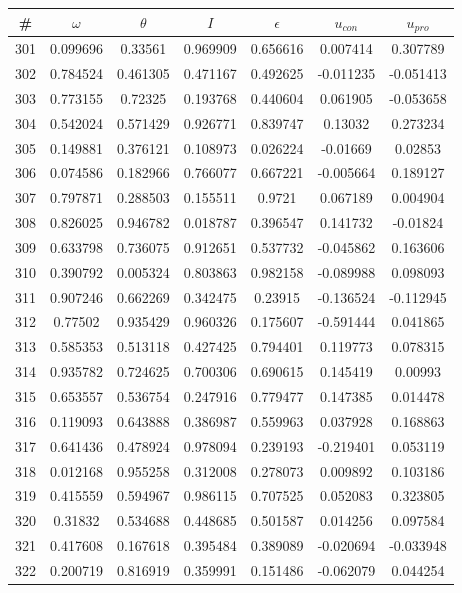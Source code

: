 \begin{table}
\begin{tabular}{c|c|c|c|c|c|c}
\# & $\omega$ & $\theta$ & $I$ & $\epsilon$ & $u_{con}$ & $u_{pro}$\\
\hline
301 & 0.099696 & 0.33561 & 0.969909 & 0.656616 & 0.007414 & 0.307789\\
302 & 0.784524 & 0.461305 & 0.471167 & 0.492625 & -0.011235 & -0.051413\\
303 & 0.773155 & 0.72325 & 0.193768 & 0.440604 & 0.061905 & -0.053658\\
304 & 0.542024 & 0.571429 & 0.926771 & 0.839747 & 0.13032 & 0.273234\\
305 & 0.149881 & 0.376121 & 0.108973 & 0.026224 & -0.01669 & 0.02853\\
306 & 0.074586 & 0.182966 & 0.766077 & 0.667221 & -0.005664 & 0.189127\\
307 & 0.797871 & 0.288503 & 0.155511 & 0.9721 & 0.067189 & 0.004904\\
308 & 0.826025 & 0.946782 & 0.018787 & 0.396547 & 0.141732 & -0.01824\\
309 & 0.633798 & 0.736075 & 0.912651 & 0.537732 & -0.045862 & 0.163606\\
310 & 0.390792 & 0.005324 & 0.803863 & 0.982158 & -0.089988 & 0.098093\\
311 & 0.907246 & 0.662269 & 0.342475 & 0.23915 & -0.136524 & -0.112945\\
312 & 0.77502 & 0.935429 & 0.960326 & 0.175607 & -0.591444 & 0.041865\\
313 & 0.585353 & 0.513118 & 0.427425 & 0.794401 & 0.119773 & 0.078315\\
314 & 0.935782 & 0.724625 & 0.700306 & 0.690615 & 0.145419 & 0.00993\\
315 & 0.653557 & 0.536754 & 0.247916 & 0.779477 & 0.147385 & 0.014478\\
316 & 0.119093 & 0.643888 & 0.386987 & 0.559963 & 0.037928 & 0.168863\\
317 & 0.641436 & 0.478924 & 0.978094 & 0.239193 & -0.219401 & 0.053119\\
318 & 0.012168 & 0.955258 & 0.312008 & 0.278073 & 0.009892 & 0.103186\\
319 & 0.415559 & 0.594967 & 0.986115 & 0.707525 & 0.052083 & 0.323805\\
320 & 0.31832 & 0.534688 & 0.448685 & 0.501587 & 0.014256 & 0.097584\\
321 & 0.417608 & 0.167618 & 0.395484 & 0.389089 & -0.020694 & -0.033948\\
322 & 0.200719 & 0.816919 & 0.359991 & 0.151486 & -0.062079 & 0.044254\\

\end{tabular}
\end{table}

